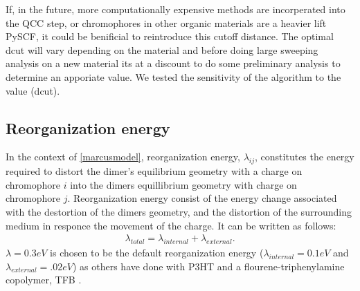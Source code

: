 If, in the future, more computationally expensive methods are incorperated into the QCC step, or chromophores in other
organic materials are a heavier lift PySCF, it could be benificial to reintroduce this cutoff distance. The optimal dcut will vary depending on the material and before doing large sweeping analysis on a new
material its at a discount to do some preliminary analysis to determine an apporiate value. We tested the
sensitivity of the algorithm to the value (dcut). 

\subsection{Reorganization energy}

In the context of \autoref{marcusmodel}, 
reorganization energy, $\lambda_{ij}$, constitutes the energy required to distort the dimer's equilibrium geometry with a
charge on chromophore $i$ into the dimers equillibrium geometry with charge on chromophore $j$.
Reorganization energy consist of the energy change associated with the destortion of the dimers geometry,
and the distortion of the surrounding medium in responce the movement of the charge. It can be written as
follows:
\begin{align}
    \lambda_{total} = \lambda_{internal} + \lambda_{external}.
\end{align} 
$\lambda = 0.3eV$ is chosen to be the default reorganization energy ($\lambda_{internal} = 0.1eV$
and $\lambda_{external} = .02eV$) as others have done with P3HT \cite{jones2017} and
a flourene-triphenylamine copolymer, TFB \cite{Gali2017}. 

